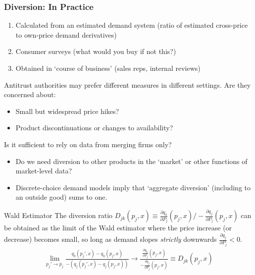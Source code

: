 \documentclass[aspectratio=169,10pt]{beamer}
\begin{document}
\begin{frame}
\frametitle{Diversion: In Practice}
\footnotesize
\begin{enumerate}
\item Calculated from an estimated demand system (ratio of estimated cross-price to own-price demand derivatives)
\item Consumer surveys (what would you buy if not this?)
\item Obtained in `course of business' (sales reps, internal reviews)
\end{enumerate}
Antitrust authorities may prefer different measures in different settings. Are they concerned about:
\begin{itemize}
\item Small but widespread price hikes?
\item Product discontinuations or changes to availability?
\end{itemize}
Is it sufficient to rely on data from merging firms only?
\begin{itemize}
\item Do we need diversion to other products in the `market' or other functions of market-level data?
\item Discrete-choice demand models imply that `aggregate diversion' (including to an outside good) sums to one.
\end{itemize}
\end{frame}


\begin{frame}{Wald Estimator}
The diversion ratio $D_{jk}(p_j,x) \equiv\frac{\partial q_k}{\partial P_j}(p_j,x)/-\frac{\partial q_j}{\partial P_j}(p_j,x)$ can be obtained as the limit of the Wald estimator where the price increase (or decrease) becomes small, so long as demand slopes \textit{strictly} downwards $\frac{\partial q_j}{\partial P_j} <0$.
\begin{align*}                               
\lim_{p_j' \rightarrow p_j} \frac{q_k(p_j',x) - q_k(p_j,x)}{-(q_j(p_j',x) - q_j(p_j,x))} \rightarrow \frac{\frac{\partial q_k}{\partial P_j}(p_j,x)}{-\frac{\partial q_j}{\partial P_j}(p_j,x)} \equiv D_{jk}(p_j,x)
\end{align*}
\end{frame}
\end{document}

